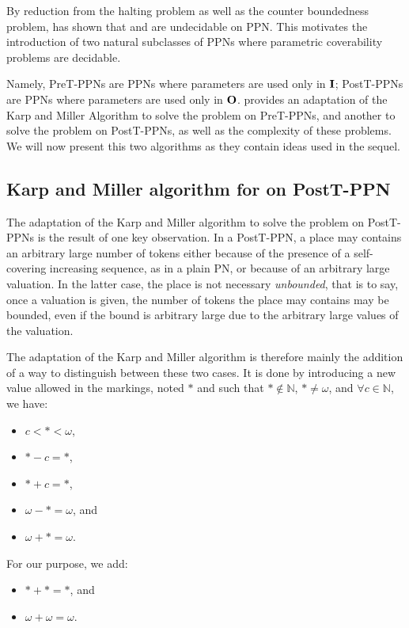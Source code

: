 \label{sec:preliminaries-ppn}

By reduction from the halting problem as well as the counter boundedness problem, \cite{David17} has shown that \Ucov and \Ecov are undecidable on \ac{PPN}.
This motivates the introduction of two natural subclasses of \acp{PPN} where parametric coverability problems are decidable.

Namely,
PreT-PPNs are \acp{PPN} where parameters are used only in $\mathbf{I}$;
PostT-PPNs are \acp{PPN} where parameters are used only in $\mathbf{O}$.
\cite{David17} provides an adaptation of the Karp and Miller Algorithm to solve the \Ucov problem on PreT-\acp{PPN}, and another to solve the \Ecov problem on PostT-\acp{PPN}, as well as the complexity of these problems.
We will now present this two algorithms as they contain ideas used in the sequel.

\subsection{Karp and Miller algorithm for \Ecov on PostT-\ac{PPN}}

The adaptation of the Karp and Miller algorithm to solve the \Ecov problem on PostT-\acp{PPN} is the result of one key observation.
In a PostT-\ac{PPN}, a place may contains an arbitrary large number of tokens either because of the presence of a self-covering increasing sequence, as in a plain \ac{PN}, or because of an arbitrary large valuation.
In the latter case, the place is not necessary \emph{unbounded}, that is to say, once a valuation is given, the number of tokens the place may contains may be bounded, even if the bound is arbitrary large due to the arbitrary large values of the valuation.

The adaptation of the Karp and Miller algorithm is therefore mainly the addition of a way to distinguish between these two cases.
It is done by introducing a new value allowed in the markings, noted $*$ and such that $* \notin \mathbb{N}$, $* \neq \omega$, and $\forall c \in \mathbb{N}$, we have:
\begin{itemize}
  \item $c < * < \omega$,
  \item $* - c = *$,
  \item $* + c = *$,
  \item $\omega - * = \omega$, and
  \item $\omega + * = \omega$.
\end{itemize}

For our purpose, we add: 
\begin{itemize}
  \item $* + * = *$, and
  \item $\omega + \omega = \omega$.
\end{itemize}

